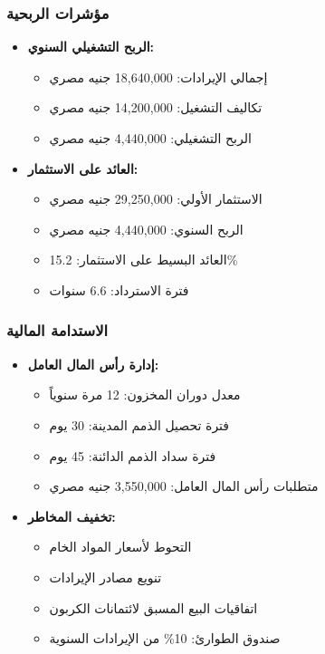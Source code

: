 \subsubsection{مؤشرات الربحية}
\begin{itemize}
    \item \textbf{الربح التشغيلي السنوي:}
    \begin{itemize}
        \item إجمالي الإيرادات: 18,640,000 جنيه مصري
        \item تكاليف التشغيل: 14,200,000 جنيه مصري
        \item الربح التشغيلي: 4,440,000 جنيه مصري
    \end{itemize}
    
    \item \textbf{العائد على الاستثمار:}
    \begin{itemize}
        \item الاستثمار الأولي: 29,250,000 جنيه مصري
        \item الربح السنوي: 4,440,000 جنيه مصري
        \item العائد البسيط على الاستثمار: 15.2\%
        \item فترة الاسترداد: 6.6 سنوات
    \end{itemize}
\end{itemize}

\subsubsection{الاستدامة المالية}
\begin{itemize}
    \item \textbf{إدارة رأس المال العامل:}
    \begin{itemize}
        \item معدل دوران المخزون: 12 مرة سنوياً
        \item فترة تحصيل الذمم المدينة: 30 يوم
        \item فترة سداد الذمم الدائنة: 45 يوم
        \item متطلبات رأس المال العامل: 3,550,000 جنيه مصري
    \end{itemize}
    
    \item \textbf{تخفيف المخاطر:}
    \begin{itemize}
        \item التحوط لأسعار المواد الخام
        \item تنويع مصادر الإيرادات
        \item اتفاقيات البيع المسبق لائتمانات الكربون
        \item صندوق الطوارئ: 10\% من الإيرادات السنوية
    \end{itemize}
\end{itemize}

